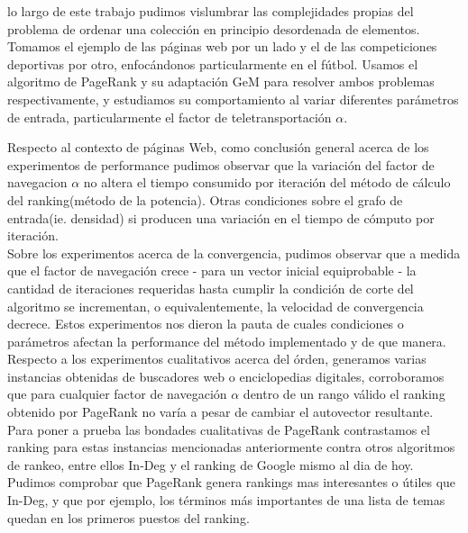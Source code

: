  lo largo de este trabajo pudimos vislumbrar las complejidades propias del problema de ordenar una colección en principio desordenada de elementos. Tomamos el ejemplo de las páginas web por un lado y el de las competiciones deportivas por otro, enfocándonos particularmente en el fútbol. Usamos el algoritmo de PageRank y su adaptación GeM para resolver ambos problemas respectivamente, y estudiamos su comportamiento al variar diferentes parámetros de entrada, particularmente el factor de teletransportación $\alpha$.

Respecto al contexto de páginas Web, como conclusión general acerca de los experimentos de performance pudimos observar que la variación del factor de navegacion $\alpha$ no altera el tiempo consumido por iteración del método de cálculo del ranking(método de la potencia). Otras condiciones sobre el grafo de entrada(ie. densidad) si producen una variación en el tiempo de cómputo por iteración. \\
Sobre los experimentos acerca de la convergencia, pudimos observar que a medida que el factor de navegación crece - para un vector inicial equiprobable - la cantidad de iteraciones requeridas hasta cumplir la condición de corte del algoritmo se incrementan, o equivalentemente, la velocidad de convergencia decrece. Estos experimentos nos dieron la pauta de cuales condiciones o parámetros afectan la performance del método implementado y de que manera.
Respecto a los experimentos cualitativos acerca del órden, generamos varias instancias obtenidas de buscadores web o enciclopedias digitales, corroboramos que para cualquier factor de navegación $\alpha$ dentro de un rango válido el ranking obtenido por PageRank no varía a pesar de cambiar el autovector resultante. Para poner a prueba las bondades cualitativas de PageRank contrastamos el ranking para estas instancias mencionadas anteriormente contra otros algoritmos de rankeo, entre ellos In-Deg y el ranking de Google mismo al dia de hoy. Pudimos comprobar que PageRank genera rankings mas interesantes o útiles que In-Deg, y que por ejemplo, los términos más importantes de una lista de temas quedan en los primeros puestos del ranking.

